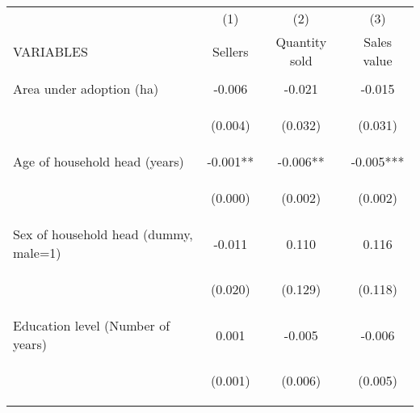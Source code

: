 \begin{center}
\begin{tabular}{lccc} \hline
 & (1) & (2) & (3) \\
VARIABLES & Sellers & Quantity sold & Sales value \\ \hline
\vspace{4pt} & \begin{footnotesize}\end{footnotesize} & \begin{footnotesize}\end{footnotesize} & \begin{footnotesize}\end{footnotesize} \\
Area under adoption (ha) & -0.006 & -0.021 & -0.015 \\
\vspace{4pt} & \begin{footnotesize}(0.004)\end{footnotesize} & \begin{footnotesize}(0.032)\end{footnotesize} & \begin{footnotesize}(0.031)\end{footnotesize} \\
Age of household head (years) & -0.001** & -0.006** & -0.005*** \\
\vspace{4pt} & \begin{footnotesize}(0.000)\end{footnotesize} & \begin{footnotesize}(0.002)\end{footnotesize} & \begin{footnotesize}(0.002)\end{footnotesize} \\
Sex of household head (dummy, male=1) & -0.011 & 0.110 & 0.116 \\
\vspace{4pt} & \begin{footnotesize}(0.020)\end{footnotesize} & \begin{footnotesize}(0.129)\end{footnotesize} & \begin{footnotesize}(0.118)\end{footnotesize} \\
Education level (Number of years) & 0.001 & -0.005 & -0.006 \\
\vspace{4pt} & \begin{footnotesize}(0.001)\end{footnotesize} & \begin{footnotesize}(0.006)\end{footnotesize} & \begin{footnotesize}(0.005)\end{footnotesize} \\

\end{tabular}
\end{center}
